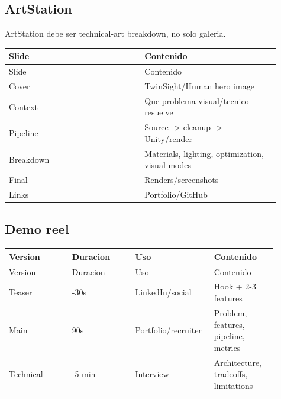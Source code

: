 \subsection{ArtStation}


ArtStation debe ser technical-art breakdown, no solo galeria.


\begin{center}
\scriptsize
\begin{longtable}{>{\raggedright\arraybackslash}p{0.455\linewidth} >{\raggedright\arraybackslash}p{0.455\linewidth}}
\toprule
Slide & Contenido \\
\midrule
\endfirsthead
\toprule
Slide & Contenido \\
\midrule
\endhead
Cover & TwinSight/Human hero image \\
Context & Que problema visual/tecnico resuelve \\
Pipeline & Source -> cleanup -> Unity/render \\
Breakdown & Materials, lighting, optimization, visual modes \\
Final & Renders/screenshots \\
Links & Portfolio/GitHub \\
\bottomrule
\end{longtable}
\end{center}



\subsection{Demo reel}


\begin{center}
\scriptsize
\begin{longtable}{>{\raggedright\arraybackslash}p{0.225\linewidth} >{\raggedright\arraybackslash}p{0.225\linewidth} >{\raggedright\arraybackslash}p{0.225\linewidth} >{\raggedright\arraybackslash}p{0.225\linewidth}}
\toprule
Version & Duracion & Uso & Contenido \\
\midrule
\endfirsthead
\toprule
Version & Duracion & Uso & Contenido \\
\midrule
\endhead
Teaser & 15-30s & LinkedIn/social & Hook + 2-3 features \\
Main & 90s & Portfolio/recruiter & Problem, features, pipeline, metrics \\
Technical & 3-5 min & Interview & Architecture, tradeoffs, limitations \\
\bottomrule
\end{longtable}
\end{center}



